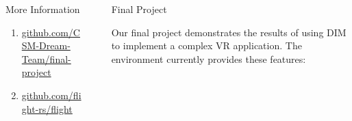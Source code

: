 \documentclass[final]{beamer}
\newlength{\sepwid}
\newlength{\onecolwid}
\begin{document}
\begin{frame}[t]
\begin{columns}[t]
\begin{column}{\onecolwid}

                \begin{alertblock}{More Information}

                    \begin{enumerate}[leftmargin=6.5cm, labelsep=1cm]

                        \item[\textbf{Project}]
                            \href{https://github.com/CSM-Dream-Team/final-project}{\url{github.com/CSM-Dream-Team/final-project}}

                        \item[\textbf{Flight}]
                            \href{https://github.com/flight-rs/flight}{\url{github.com/flight-rs/flight}}
                    \end{enumerate}

                \end{alertblock}
            \end{column} %

            \begin{column}{\sepwid}\end{column} %

            \begin{column}{\onecolwid} %

                \begin{block}{Final Project}
                    \setlength{\parskip}{0.5em}

                    Our final project demonstrates the results of using DIM to
                    implement a complex VR application. The environment
                    currently provides these features:
                    \begin{itemize}


\end{itemize}
\end{block}
\end{column}
\end{columns}
\end{frame}
\end{document}
